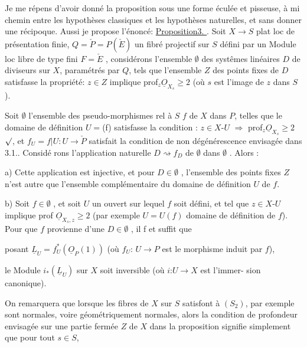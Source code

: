 Je me répens d'avoir donné la proposition  sous une forme éculée et
pisseuse, à mi chemin entre  les hypothèses classiques et les hypothèses
naturelles, et sans donner une récipoque. Aussi je propose l'énoncé:
\uline{Proposition3. }.  Soit $X \to S$ plat loc de présentation
finie,  $Q=\check{P} = P(\check{E})$  un fibré  projectif sur $S$ défini par
un Module loc  libre de type fini $F = \check{E}$ ,  considérons l'ensemble
$\emptyset$  des systêmes linéaires $D$  de diviseurs  sur $X$, paramétrés par $Q$, tels
que l'ensemble  $Z$ des points fixes de $D$  satisfasse la propriété: $z \in Z$
implique prof$_z \underline{O}_{X_s} \geqslant 2$  (où  $s$  est l'image de $z$ dans $S$). 

  Soit $\emptyset$ l'ensemble des  pseudo-morphismes rel à
$S$ $f$ de $X$ dans  $P$, telles que le domaine de définition $U=$(f)
 satisfasse la condition : $z \in X$-$U$ $\Longrightarrow$ prof$_z \underline{O}_{X_s} \geqslant 2$$\surd$, et $f_U = f|U : U \to \check{P}$ satisfait la condition de non dégénérescence envisagée dans 3.1.. Considé
rons l'application naturelle  $D \rightsquigarrow f_D$  de $\emptyset$  dans $\emptyset$ .  Alors :

a)  Cette application est injective,  et  pour $D \in \emptyset$ , l'ensemble des
points fixes $Z$  n'est autre que l'ensemble  complémentaire du domaine de
définition  $U$ de $f$.

b)   Soit
$f \in \emptyset$ , et soit $U$ un ouvert sur lequel $f$ soit défini, et tel que $z \in X$-$U$
implique prof $\underline{O}_{X_s,z} \geqslant 2$  (par exemple $U = U(f)$ domaine de
définition de $f$). Pour que $f$ provienne d'une $D \in \emptyset$ , il f et suffit  que\hand{\unsure{$\surd$}}

posant $\underline{L}_U = f_U^*(\underline{O}_P(1))$  (où  $f_U$: $U \to P$  est le morphisme induit par $f$),

 le Module  $i_*(\underline{L}_U)$  sur $X$ soit inversible (où $i$:$U \to X$ est l'immer-%
sion canonique).

On remarquera que lorsque  les fibres de $X$ sur $S$ satisfont à $(S_2)$,
par exemple sont normales, voire géométriquement  normales, alors la
condition de profondeur  envisagée sur  une partie fermée $Z$ de $X$ dans 
la proposition  signifie simplement que pour tout $s \in S$,


